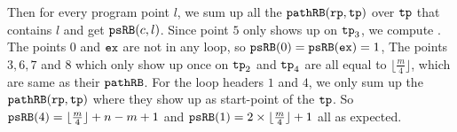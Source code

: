 Then for every program point $l$, we sum up all the $\mathtt{pathRB}(\mathtt{rp}, \mathtt{tp})$ over $\mathtt{tp}$ that contains $l$ and get $\mathtt{psRB}(c, l)$.
Since point $5$ only shows up on $\mathtt{tp}_3$, we compute .
The points $0$ and $\mathtt{ex}$ are not in any loop, so $\mathtt{psRB}(0) = \mathtt{psRB}(\mathtt{ex}) = 1$,
The points $3, 6, 7$ and $8$ which only show up once on $\mathtt{tp}_2$ and $\mathtt{tp}_4$ are all equal to $\lfloor\frac{m}{4}\rfloor$, which are same as their $\mathtt{pathRB}$.
For the loop headers $1$ and $4$, we only sum up the $\mathtt{pathRB}(\mathtt{rp}, \mathtt{tp})$ where they show up as start-point of the $\mathtt{tp}$.
So $\mathtt{psRB}(4) =  \lfloor\frac{m}{4}\rfloor + n - m + 1$ and $\mathtt{psRB}(1) = 2 \times \lfloor\frac{m}{4}\rfloor + 1$ all as expected.



